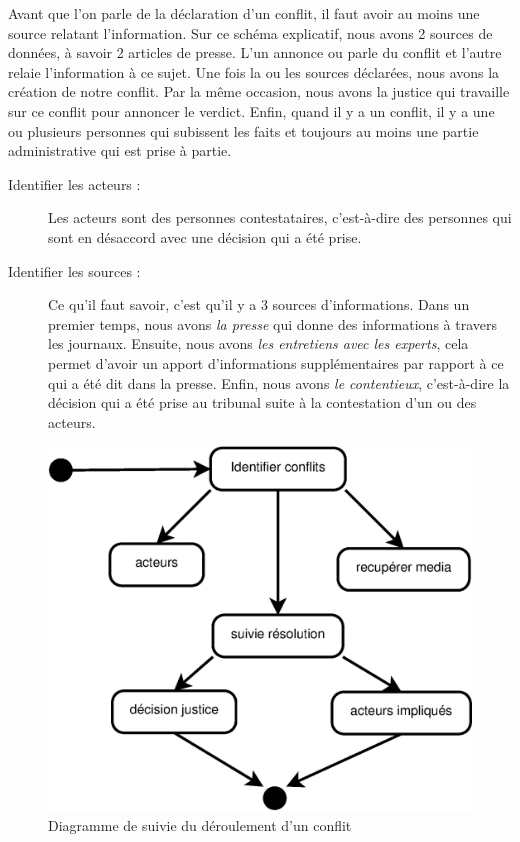 \documentclass[12pt,a4paper]{article}
\begin{document}
Avant que l'on parle de la déclaration d'un conflit, il faut avoir au moins une source relatant l'information. Sur ce schéma explicatif, nous avons 2 sources de données, à savoir 2 articles de presse. L'un annonce ou parle du conflit et l'autre relaie l'information à ce sujet. Une fois la ou les sources déclarées, nous avons la création de notre conflit. Par la même occasion, nous avons la justice qui travaille sur ce conflit pour annoncer le verdict. Enfin, quand il y a un conflit, il y a une ou plusieurs personnes qui subissent les faits et toujours au moins une partie administrative qui est prise à partie. \newline

\begin{description}
\item[Identifier les acteurs :] Les acteurs sont des personnes contestataires, c'est-à-dire des personnes qui sont en désaccord avec une décision qui a été prise. 
\item[Identifier les sources :] Ce qu'il faut savoir, c'est qu'il y a 3 sources d'informations. Dans un premier temps, nous avons \textit{la presse} qui donne des informations à travers les journaux. Ensuite, nous avons \textit{les entretiens avec les experts}, cela permet d'avoir un apport d'informations supplémentaires par rapport à ce qui a été dit dans la presse. Enfin, nous avons \textit{le contentieux}, c'est-à-dire la décision qui a été prise au tribunal suite à la contestation d'un ou des acteurs. \newline
\end{description}

\clearpage
\begin{figure}[!h]
\centering
\includegraphics[scale=0.4]{Image/diagrammeConflit.eps}
\caption{Diagramme de suivie du déroulement d'un conflit}
\end{figure}
\end{document}
